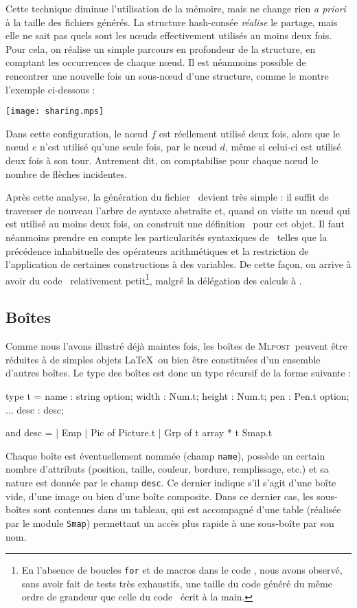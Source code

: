 \documentclass[twoside]{studia-Hermann}
\newcommand{\mlpost}{\textsc{Mlpost}}
\newcommand{\metapost}{\MP}
\begin{document}
Cette technique diminue l'utilisation de la mémoire, mais ne change rien {\em a
priori} à la taille des fichiers générés. La structure hash-consée {\em
réalise} le partage, mais elle ne sait pas quels sont les n\oe uds
effectivement 
utilisés au moins deux fois. Pour cela, on réalise un simple parcours
en profondeur de la structure, en comptant les occurrences de chaque
n\oe ud.  Il est néanmoins
possible de rencontrer une nouvelle fois un sous-n\oe ud d'une structure,
comme le montre l'exemple ci-dessous :

\begin{center}
\texttt{[image: sharing.mps]}
\end{center}

\noindent Dans cette configuration, le n\oe ud $f$ est réellement utilisé deux
fois, alors que le n\oe ud $e$ n'est utilisé qu'une seule fois, par le
n\oe ud $d$, même si celui-ci est utilisé deux fois à son tour.
Autrement dit, on comptabilise pour chaque n\oe ud le nombre de
flèches incidentes.

Après cette analyse, la génération du fichier \metapost\ devient très simple :
il suffit de traverser de nouveau l'arbre de syntaxe abstraite et,
quand on visite un n\oe ud 
qui est utilisé au moins deux fois,  on construit une définition
\metapost\ pour cet objet. Il faut néanmoins
prendre en compte les particularités syntaxiques de \metapost\ telles que la
précédence inhabituelle des opérateurs arithmétiques et la restriction de
l'application de certaines constructions à des variables. De cette façon, on
arrive à avoir du code \metapost\ relativement petit\footnote{En l'absence de
boucles \texttt{for} et de macros dans le code \metapost, nous avons observé,
sans avoir fait de tests très exhaustifs, une taille du code généré du
même ordre de grandeur que celle du code \metapost\ écrit à la main.},
malgré la délégation des calculs à \metapost. 

\subsection{Boîtes}\label{subsec:boxes}

Comme nous l'avons illustré déjà maintes fois, les boîtes de \mlpost\
peuvent être réduites à de simples objets \LaTeX\ ou bien être
constituées d'un ensemble d'autres boîtes. Le type des boîtes est donc
un type récursif de la forme suivante :
\begin{ocaml}
type t =
  { name : string option;
    width : Num.t;  height : Num.t; 
    pen : Pen.t option; ...
    desc : desc; }
    
and desc = 
  | Emp
  | Pic of Picture.t
  | Grp of t array * t Smap.t
\end{ocaml}
Chaque boîte est éventuellement nommée (champ \texttt{name}), possède
un certain nombre d'attributs (position, taille, couleur, bordure,
remplissage, etc.) et sa nature est donnée par le champ \texttt{desc}.
Ce dernier indique s'il s'agit d'une boîte vide, d'une image ou bien
d'une boîte composite. Dans ce dernier cas, les sous-boîtes sont
contenues dans un tableau, qui est accompagné d'une table (réalisée
par le module \texttt{Smap}) permettant un accès plus rapide à une 
sous-boîte par son nom.
\end{document}
